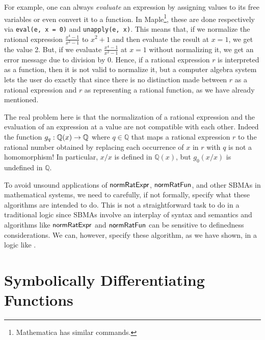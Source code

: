 \documentclass[fleqn]{llncs}
\newcommand{\QQ}{\ensuremath{\mathbb{Q}}}
\newcommand{\NRE}{\ensuremath{\mname{normRatExpr}}}
\newcommand{\NRF}{\ensuremath{\mname{normRatFun}}}
\begin{document}
For example, one can always \emph{evaluate} an expression by assigning
values to its free variables or even convert it to a function.  In
Maple\footnote{Mathematica has similar commands.}, these are done
respectively via \texttt{eval(e, x = 0)} and \texttt{unapply(e, x)}.
This means that, if we normalize the rational expression
$\frac{x^4-1}{x^2-1}$ to $x^2+1$ and then evaluate the result at $x =
1$, we get the value 2.  But, if we evaluate $\frac{x^4-1}{x^2-1}$ at
$x = 1$ without normalizing it, we get an error message due to
division by 0.  Hence, if a rational expression $r$ is interpreted as
a function, then it is not valid to normalize it, but a computer algebra
system lets the user do exactly that since there is no distinction
made between $r$ as a rational expression and $r$ as representing a
rational function, as we have already mentioned.

The real problem here is that the normalization of a rational
expression and the evaluation of an expression at a value are not
compatible with each other.  Indeed the function $g_q : \QQ(x) \tarrow
\QQ$ where $q \in \QQ$ that maps a rational expression $r$ to the
rational number obtained by replacing each occurrence of $x$ in $r$
with $q$ is not a homomorphism!  In particular, $x/x$ is defined in
$\QQ(x)$, but $g_0(x/x)$ is undefined in $\QQ$.

\iffalse

We can exhibit the problematic behavior as follows: \todo{insert some
  Maple code with output here} In fact, there is an even more
pervasive, one could even say \emph{obnoxious}, way of doing this: as
the underlying language is \emph{imperative}, it is possible to do:
\begin{verbatim}
  e := (x^4-1)/(x^2-1);
  # many, many more lines of 'code'
  x := 1;
  # try to use 'e'
\end{verbatim}

\fi

To avoid unsound applications of {\NRE}, {\NRF}, and other SBMAs in
mathematical systems, we need to carefully, if not formally, specify
what these algorithms are intended to do.  This is not a
straightforward task to do in a traditional logic since SBMAs involve
an interplay of syntax and semantics and algorithms like {\NRE} and
{\NRF} can be sensitive to definedness considerations.  We can,
however, specify these algorithm, as we have shown, in a logic like
{\churchqe}.

\section{Symbolically Differentiating Functions}\label{sec:diff}
\end{document}
